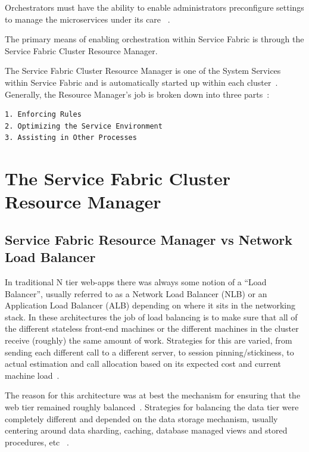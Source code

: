 Orchestrators must have the ability to enable administrators
preconfigure settings to manage the microservices under its care
~\cite{hid-sp18-501-cluster}.

The primary means of enabling orchestration within Service Fabric is
through the Service Fabric Cluster Resource Manager.

The Service Fabric Cluster Resource Manager is one of the System
Services within Service Fabric and is automatically started up within
each cluster~\cite{hid-sp18-501-fig2and3}.  
Generally, the Resource Manager’s job is broken down
into three parts~\cite{hid-sp18-501-fig2and3}:

\begin{verbatim}
1. Enforcing Rules
2. Optimizing the Service Environment
3. Assisting in Other Processes
\end{verbatim}

\section{The Service Fabric Cluster Resource Manager}

\subsection{Service Fabric Resource Manager vs Network Load Balancer}

In traditional N tier web-apps there was always some notion of a “Load
Balancer”, usually referred to as a Network Load Balancer (NLB) or an
Application Load Balancer (ALB) depending on where it sits in the
networking stack. In these architectures the job of load balancing is
to make sure that all of the different stateless front-end machines or
the different machines in the cluster receive (roughly) the same
amount of work. Strategies for this are varied, from sending each
different call to a different server, to session pinning/stickiness,
to actual estimation and call allocation based on its expected cost
and current machine load~\cite{hid-sp18-501-fig2and3}.

The reason for this architecture was at best the mechanism for
ensuring that the web tier remained roughly
balanced~\cite{hid-sp18-501-fig2and3}.  Strategies for balancing the
data tier were completely different and depended on the data storage
mechanism, usually centering around data sharding, caching, database
managed views and stored procedures, etc
~\cite{hid-sp18-501-fig2and3}.

